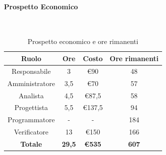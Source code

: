 \documentclass{article}
\begin{document}
                \paragraph{Prospetto Economico}\mbox{}\\
                \begin{table}[H]
                    \centering
                    \begin{tabular}{|c|c|c|c|}
                    \hline
                    \textbf{Ruolo}  & \textbf{Ore}  & \textbf{Costo} & \textbf{Ore rimanenti} \\ \hline
                    Responsabile    & 3             & €90            & 48                     \\ \hline
                    Amministratore  & 3,5           & €70            & 57                   \\ \hline
                    Analista        & 4,5           & €87,5          & 58                   \\ \hline
                    Progettista     & 5,5           & €137,5         & 94                   \\ \hline
                    Programmatore   & -            & -           & 184                    \\ \hline
                    Verificatore    & 13            & €150           & 166                    \\ \hline
                    \textbf{Totale} & \textbf{29,5} & \textbf{\euro535}   & \textbf{607}         \\ \hline
                    \end{tabular}
                    \caption{Prospetto economico e ore rimanenti}
                \end{table}
\end{document}
